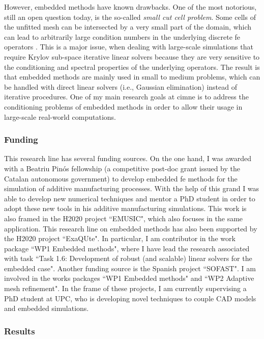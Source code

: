 \documentclass{article}
\newcommand{\bemph}[1]{#1}
\begin{document}
However, embedded methods have known drawbacks. One of the most notorious, still an open question today, is the so-called \emph{small cut cell problem}. Some cells of the unfitted mesh can be intersected by a very small part of the domain, which can lead to arbitrarily large condition numbers in the underlying discrete \ac{fe} operators \cite{DePrenter2017}. This is a major issue, when dealing with large-scale simulations that require Krylov sub-space iterative linear solvers \cite{saad_iterative_2003} because they are very sensitive to the conditioning and spectral properties of the underlying operators. The result is that embedded methods are mainly used in small to medium problems, which can be handled with direct linear solvers (i.e., Gaussian elimination) instead of iterative procedures. \bemph{One of my main research goals at \ac{cimne} is to address the conditioning problems of embedded methods in order to allow their usage in large-scale real-world computations}.


\subsubsection{Funding}

This research line has several funding sources. On the one hand, I was awarded with a Beatriu Pinós fellowship (a competitive post-doc grant issued by the Catalan autonomous government) to develop embedded \ac{fe} methods for the simulation of additive manufacturing processes. With the help of this grand I was able to develop new numerical techniques and mentor a PhD student in order to adopt these new tools in his additive manufacturing simulations. This work is also framed in the  H2020 project ``EMUSIC", which also focuses in the same application.  This research line  on embedded methods has also been supported by the  H2020 project ``ExaQUte". In particular, I am contributor in the work package ``WP1 Embedded methods", where I have lead the research associated with task ``Task 1.6: Development of robust (and scalable) linear solvers for the embedded case". Another funding source is the Spanish project  ``SOFAST".  I am involved in the works packages ``WP1 Embedded methods" and ``WP2 Adaptive mesh refinement". In the frame of these projects, I am currently supervising a PhD student at UPC, who is developing novel techniques to couple CAD models and embedded simulations.


\subsubsection{Results}
\end{document}
